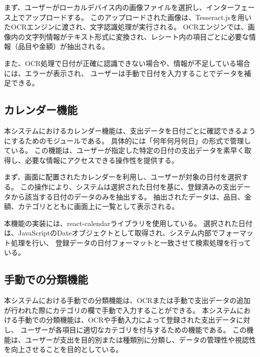 \documentclass[main]{subfiles}
\begin{document}
まず、ユーザーがローカルデバイス内の画像ファイルを選択し、インターフェース上でアップロードする。
このアップロードされた画像は、Tesseract.jsを用いたOCRエンジンに渡され、文字認識処理が実行される。
OCRエンジンでは、画像内の文字列情報がテキスト形式に変換され、レシート内の項目ごとに必要な情報（品目や金額）が抽出される。

また、OCR処理で日付が正確に認識できない場合や、情報が不足している場合には、エラーが表示され、
ユーザーは手動で日付を入力することでデータを補足できる。

\subsection{カレンダー機能}

本システムにおけるカレンダー機能は、支出データを日付ごとに確認できるようにするためのモジュールである。
具体的には「何年何月何日」の形式で管理している。
この機能は、ユーザーが指定した特定の日付の支出データを素早く取得し、必要な情報にアクセスできる操作性を提供する。

まず、画面に配置されたカレンダーを利用し、ユーザーが対象の日付を選択する。
この操作により、システムは選択された日付を基に、登録済みの支出データから該当する日付のデータのみを抽出する。
抽出されたデータは、品目、金額、カテゴリとともに画面上に一覧として表示される。

本機能の実装には、react-calendarライブラリを使用している。
選択された日付は、JavaScriptのDateオブジェクトとして取得され、システム内部でフォーマット処理を行い、
登録データの日付フォーマットと一致させて検索処理を行っている。

\subsection{手動での分類機能}

本システムにおける手動での分類機能は、OCRまたは手動で支出データの追加が行われた際にカテゴリの欄で手動で入力することができる。
本システムにおける手動での分類機能は、OCRや手動入力によって登録された支出データに対し、
ユーザーが各項目に適切なカテゴリを付与するための機能である。
この機能は、ユーザーが支出を目的別または種類別に分類し、データの管理性や視認性を向上させることを目的としている。
\end{document}
